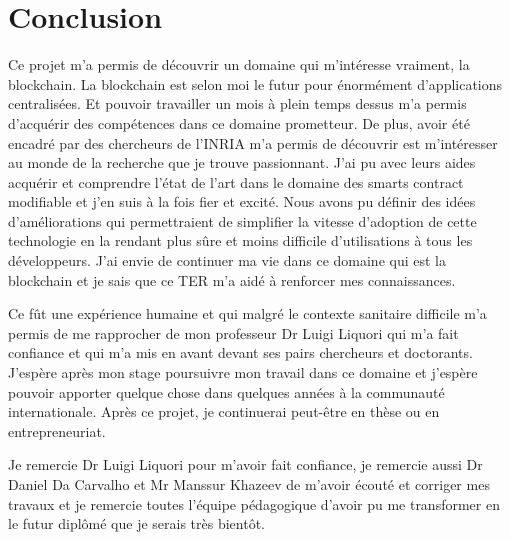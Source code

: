 \section{Conclusion}

Ce projet m'a permis de découvrir un domaine qui m'intéresse vraiment, la blockchain. La blockchain est selon moi
le futur pour énormément d'applications centralisées. Et pouvoir travailler un mois à plein temps dessus m'a permis 
d'acquérir des compétences dans ce domaine prometteur. De plus, avoir été encadré par des chercheurs de l'INRIA 
m'a permis de découvrir est m'intéresser au monde de la recherche que je trouve passionnant. J'ai pu avec leurs
aides acquérir et comprendre l'état de l'art dans le domaine des smarts contract modifiable et j'en suis à la fois
fier et excité. Nous avons pu définir des idées d'améliorations qui permettraient de simplifier la vitesse d'adoption
de cette technologie en la rendant plus sûre et moins difficile d'utilisations à tous les développeurs. J'ai
envie de continuer ma vie dans ce domaine qui est la blockchain et je sais que ce TER m'a aidé à renforcer mes
connaissances. 

Ce fût une expérience humaine et qui malgré le contexte sanitaire difficile m'a permis de me rapprocher de mon 
professeur Dr Luigi Liquori qui m'a fait confiance et qui m'a mis en avant devant ses pairs chercheurs et doctorants.
J'espère après mon stage poursuivre mon travail dans ce domaine et j'espère pouvoir apporter quelque chose dans quelques
années à la communauté internationale. Après ce projet, je continuerai peut-être en thèse ou en entrepreneuriat. 

Je remercie Dr Luigi Liquori pour m'avoir fait confiance, je remercie aussi Dr Daniel Da Carvalho et Mr Manssur Khazeev
de m'avoir écouté et corriger mes travaux et je remercie toutes l'équipe pédagogique d'avoir pu me transformer en le 
futur diplômé que je serais très bientôt. 
